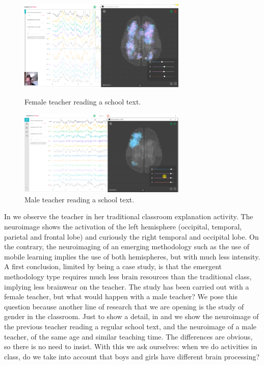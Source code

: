 \documentclass[english]{textolivre}
\begin{document}
\begin{figure}[h!]
 \centering
 \begin{minipage}{.45\textwidth}
 \includegraphics[width=\textwidth]{fig6.png}
 \caption{Female teacher reading a school text.}
 \label{fig06}
 \end{minipage}%
 \qquad
 \begin{minipage}{0.45\textwidth}
 \includegraphics[width=\textwidth]{fig7.png}
 \caption{Male teacher reading a school text.}
 \label{fig07}
 \end{minipage}%
\end{figure}

In  we observe the teacher in her traditional classroom explanation activity. The neuroimage shows the activation of the left hemisphere (occipital, temporal, parietal and frontal lobe) and curiously the right temporal and occipital lobe. On the contrary, the neuroimaging of an emerging methodology such as the use of mobile learning implies the use of both hemispheres, but with much less intensity. A first conclusion, limited by being a case study, is that the emergent methodology type requires much less brain resources than the traditional class, implying less brainwear on the teacher. The study has been carried out with a female teacher, but what would happen with a male teacher? We pose this question because another line of research that we are opening is the study of gender in the classroom. Just to show a detail, in  and  we show the neuroimage of the previous teacher reading a regular school text, and the neuroimage of a male teacher, of the same age and similar teaching time. The differences are obvious, so there is no need to insist. With this we ask ourselves: when we do activities in class, do we take into account that boys and girls have different brain processing?
\end{document}
